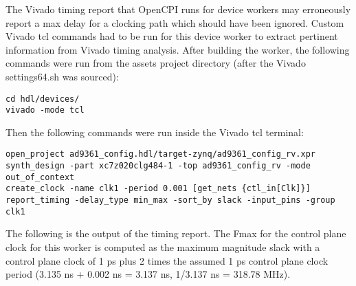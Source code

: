 \documentclass{article}
\begin{document}
The Vivado timing report that OpenCPI runs for device workers may erroneously report a max delay for a clocking path which should have been ignored. Custom Vivado tcl commands had to be run for this device worker to extract pertinent information from Vivado timing analysis. After building the worker, the following commands were run from the assets project directory (after the Vivado settings64.sh was sourced):
\begin{lstlisting}
cd hdl/devices/
vivado -mode tcl
\end{lstlisting}
Then the following commands were run inside the Vivado tcl terminal:
\begin{lstlisting}
open_project ad9361_config.hdl/target-zynq/ad9361_config_rv.xpr
synth_design -part xc7z020clg484-1 -top ad9361_config_rv -mode out_of_context
create_clock -name clk1 -period 0.001 [get_nets {ctl_in[Clk]}]
report_timing -delay_type min_max -sort_by slack -input_pins -group clk1
\end{lstlisting}
The following is the output of the timing report. The Fmax for the control plane clock for this worker is computed as the maximum magnitude slack with a control plane clock of 1 ps plus 2 times the assumed 1 ps control plane clock period (3.135 ns + 0.002 ns = 3.137 ns, 1/3.137 ns = 318.78 MHz).
\fontsize{6}{12}\selectfont
\end{document}
